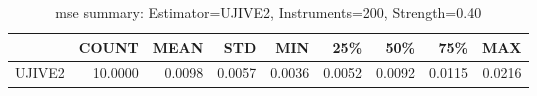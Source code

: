 \begin{table}[ht]
\centering
\caption{mse summary: Estimator=UJIVE2, Instruments=200, Strength=0.40}
\begin{tabular}{lrrrrrrrr}
\toprule
 & COUNT & MEAN & STD & MIN & 25\% & 50\% & 75\% & MAX \\
\midrule
UJIVE2 & 10.0000 & 0.0098 & 0.0057 & 0.0036 & 0.0052 & 0.0092 & 0.0115 & 0.0216 \\
\bottomrule
\end{tabular}
\end{table}
